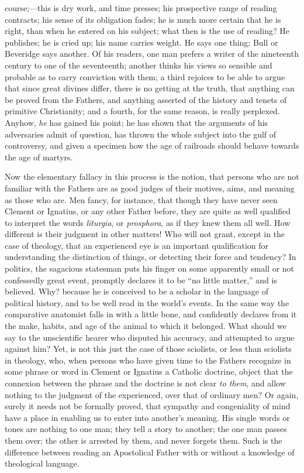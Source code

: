 course;—this is dry work, and time presses; his prospective range of
reading contracts; his sense of its obligation fades; he is much more
certain that he is right, than when he entered on his subject; what
then is the use of reading? He publishes; he is cried up; his name
carries weight. He says one thing; Bull or Beveridge says another. Of
his readers, one man prefers a writer of the nineteenth century to one
of the seventeenth; another thinks his views so sensible and probable
as to carry conviction with them; a third rejoices to be able to argue
that since great divines differ, there is no getting at the truth,
that anything can be proved from the Fathers, and anything asserted of
the history and tenets of primitive Christianity; and a fourth, for
the same reason, is really perplexed. Anyhow, \emph{he} has gained his
point; he has shown that the arguments of his adversaries admit of
question, has thrown the whole subject into the gulf of controversy,
and given a specimen how the age of railroads should behave towards
the age of martyrs.

Now the elementary fallacy in this process is the
notion, that persons who are not familiar with the Fathers are as good
judges of their motives, aims, and meaning as those who are. Men
fancy, for instance, that though they have never seen Clement or
Ignatius, or any other Father before, they are quite as well qualified
to interpret the words \emph{liturgia}, or \emph{prosphora}, as if
they knew them all well. How different is their judgment in other
matters! Who will not grant, except in the case of theology,
that an experienced eye is an important qualification for
understanding the distinction of things, or detecting their force and
tendency? In politics, the sagacious statesman puts his finger on some
apparently small or not confessedly great event, promptly declares it
to be ``no little matter,'' and is believed. Why? because he is
conceived to be a scholar in the language of political history, and to
be well read in the world's events. In the same way the comparative
anatomist falls in with a little bone, and confidently declares from
it the make, habits, and age of the animal to which it belonged. What
should we say to the unscientific hearer who disputed his accuracy,
and attempted to argue against him? Yet, is not this just the case of
those sciolists, or less than sciolists in theology, who, when persons
who have given time to the Fathers recognize in some phrase or word in
Clement or Ignatius a Catholic doctrine, object that the connexion
between the phrase and the doctrine is not clear \emph{to them}, and
allow nothing to the judgment of the experienced, over that of
ordinary men? Or again, surely it needs not be formally proved, that
sympathy and congeniality of mind have a place in enabling us to enter
into another's meaning. His single words or tones are nothing to one
man; they tell a story to another; the one man passes them over; the
other is arrested by them, and never forgets them. Such is the
difference between reading an Apostolical Father with or without a
knowledge of theological language.

